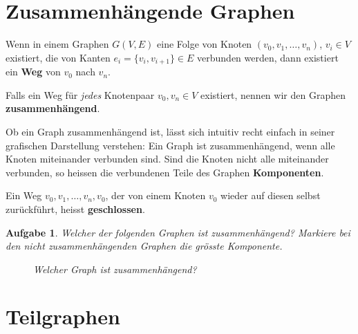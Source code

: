 \documentclass[12pt,a4paper]{report}
\theoremstyle{break}
\newtheorem{exercise}{Aufgabe}[chapter]
\theoremstyle{plain}
\begin{document}
\section{Zusammenh\"{a}ngende Graphen}

Wenn in einem Graphen $G(V,E)$ eine Folge von Knoten $(v_0, v_1,
\ldots, v_n)$, $v_i \in V$ existiert, die von Kanten $e_i = \{v_i, v_{i+1}\} \in
E$ verbunden werden, dann existiert ein \textbf{Weg} von $v_0$ nach
$v_n$. 

Falls ein Weg f\"{u}r \emph{jedes} Knotenpaar $v_0, v_n
\in V$ existiert, nennen wir den Graphen \textbf{zusammenh\"{a}ngend}.

Ob ein Graph zusammenh\"{a}ngend ist, l\"{a}sst sich intuitiv recht
einfach in seiner grafischen Darstellung verstehen: Ein Graph
ist zusammenh\"{a}ngend, wenn alle Knoten miteinander verbunden sind. Sind
die Knoten nicht alle miteinander verbunden, so heissen die verbundenen Teile des 
Graphen \textbf{Komponenten}.

Ein Weg $v_0,v_1,\ldots,v_n,{v_0}$, der von einem Knoten
$v_0$ wieder auf diesen selbst zur\"{u}ckf\"{u}hrt, heisst
\textbf{geschlossen}.

\begin{exercise}\label{exverbund}
Welcher der folgenden Graphen ist zusammenh\"{a}ngend? Markiere bei den nicht zusammenh\"{a}ngenden Graphen die
gr\"{o}sste Komponente.

\begin{figure}[H]
\begin{subfigure}[b]{0.3\textwidth}
\caption{}
\end{subfigure}
\begin{subfigure}[b]{0.3\textwidth}
\caption{}
\end{subfigure}
\begin{subfigure}[b]{0.3\textwidth}
\caption{}
\end{subfigure}

\caption{Welcher Graph ist zusammenh\"{a}ngend?}
\end{figure}

\end{exercise}

\newpage
\section{Teilgraphen}
\end{document}
